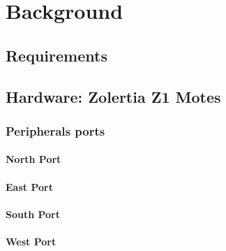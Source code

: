 \section{Background}

\subsection{Requirements}

\subsection{Hardware: Zolertia Z1 Motes}


\subsubsection{Peripherals ports}

\paragraph{North Port}
\paragraph{East Port}
\paragraph{South Port}
\paragraph{West Port}




